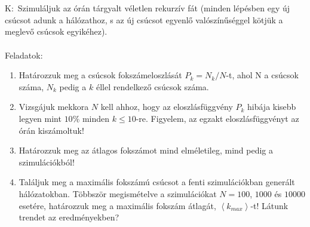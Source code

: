 \section{} \label{sec:1}
K:\ Szimuláljuk az órán tárgyalt véletlen rekurzív fát (minden lépésben egy új csúcsot adunk a hálózathoz, s az új csúcsot egyenlő valószínűséggel kötjük a meglevő csúcsok egyikéhez).
\\ \\
Feladatok:

\begin{enumerate}[label=\roman*]
    \item Határozzuk meg a csúcsok fokszámeloszlását $P_{k} = N_{k}/N$-t, ahol N a csúcsok száma, $N_{k}$ pedig a $k$ éllel rendelkező csúcsok száma.
    \item Vizsgájuk mekkora $N$ kell ahhoz, hogy az eloszlásfüggvény $P_{k}$ hibája kisebb legyen mint $10\%$ minden $k \leq 10$-re. Figyelem, az egzakt eloszlásfüggvényt az órán kiszámoltuk!
    \item Határozzuk meg az átlagos fokszámot mind elméletileg, mind pedig a szimulációkból!
    \item Találjuk meg a maximális fokszámú csúcsot a fenti szimulációkban generált hálózatokban. Többször megismételve a szimulációkat $N = 100$, $1000$ és $10000$ esetére, határozzuk meg a maximális fokszám átlagát, $\left< k_{max} \right>$-t! Látunk trendet az eredményekben?
\end{enumerate}